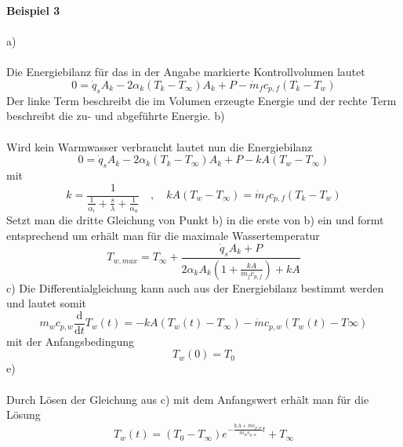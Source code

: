 \textbf{Beispiel 3}\\ \\
a) \\ \\
Die Energiebilanz für das in der Angabe markierte Kontrollvolumen lautet
\[
	0 = \dot{q}_sA_k - 2\alpha_k(T_k - T_\infty)A_k + P - \dot{m}_fc_{p,f}(T_k - T_w)
\]
Der linke Term beschreibt die im Volumen erzeugte Energie und der rechte Term beschreibt die zu- und abgeführte Energie.
b) \\ \\
Wird kein Warmwasser verbraucht lautet nun die Energiebilanz
\[
	0 = \dot{q}_sA_k - 2\alpha_k(T_k - T_\infty)A_k + P - kA(T_w - T_\infty)
\]
mit 
\[
	k = \frac{1}{\frac{1}{\alpha_i} + \frac{s}{\lambda} + \frac{1}{\alpha_a}} \quad,\quad kA(T_w - T_\infty) = \dot{m}_fc_{p,f}(T_k - T_w)
\]
Setzt man die dritte Gleichung von Punkt b) in die erste von b) ein und formt entsprechend um erhält man für die maximale Wassertemperatur
\[
	T_{w,max} = T_\infty + \frac{\dot{q}_sA_k + P}{2\alpha_kA_k\left(1 + \frac{kA}{\dot{m}_fc_{p,f}}\right) + kA}
\]
c)
Die Differentialgleichung kann auch aus der Energiebilanz bestimmt werden und lautet somit
\[
	m_wc_{p,w}\frac{\text{d}}{\text{d}t}T_w(t) = -kA(T_w(t) - T_\infty) - \dot{m}c_{p,w}(T_w(t) - T\infty)
\]
mit der Anfangsbedingung
\[
	T_w(0) = T_0
\]
e) \\ \\
Durch Lösen der Gleichung aus c) mit dem Anfangswert erhält man für die Lösung
\[
	T_w(t) = (T_0 - T_\infty)e^{-\frac{kA + \dot{m}c_{p,w}}{m_wc_{p,w}}t} + T_\infty
\]